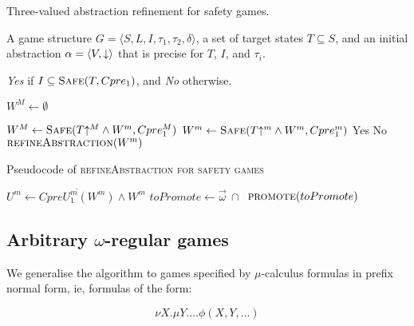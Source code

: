 \begin{algorithm}
\caption{Three-valued abstraction refinement for safety games.}
\label{alg:three_val_safe}

\begin{algorithmic}[1]

     A game structure $G = \langle S, L, I, \tau_1, \tau_2, \delta \rangle$, a set 
    of target states $T\subseteq S$, and an initial abstraction $\alpha=\langle V, \mathord{\downarrow} \rangle$
    that is precise for $T$, $I$, and $\tau_i$.

     {\it Yes} if $I \subseteq \textsc{Safe}(T, Cpre_1)$, and {\it No} otherwise.

    \State $W^M \gets \emptyset$

    \Loop
        \State $W^M \gets \textsc{Safe}(T\mathord{\uparrow^M} \wedge W^m, Cpre_1^M)$
        \State $W^m \gets \textsc{Safe}(T\mathord{\uparrow^m} \wedge W^m, Cpre_1^m)$
            \State\Return Yes
            \State\Return No
        \Else       
            \State$\Call{refineAbstraction}{W^m}$
        \EndIf
    \EndLoop
\end{algorithmic}
\end{algorithm}

\begin{algorithm}

\caption{Pseudocode of \textsc{refineAbstraction for safety games}}
\label{alg:refineAbstractionSafe}

\begin{algorithmic}[1]
\State $U^m \gets \overline{CpreU_1^{m}(W^m)} \land W^m$
    \State $toPromote \gets \vec{\omega}~\cap~$
    \State $\Call{promote}{toPromote}$
\EndFunction
\end{algorithmic}
\end{algorithm}

\subsection{Arbitrary $\omega$-regular games}

We generalise the algorithm to games specified by $\mu$-calculus formulas in prefix normal form, ie, formulas of the form:

\begin{equation}
\nu X. \mu Y. \ldots \phi(X, Y, \ldots)
\end{equation}

